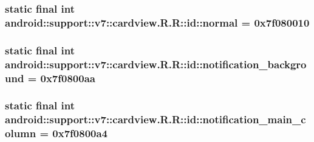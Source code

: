 \hypertarget{classandroid_1_1support_1_1v7_1_1cardview_1_1_r_1_1id_d8b0faa4f60ab44db8f47ee4c0db2f53}{
\subsubsection[{normal}]{\setlength{\rightskip}{0pt plus 5cm}static final int android::support::v7::cardview.R.R::id::normal = 0x7f080010}}
\label{classandroid_1_1support_1_1v7_1_1cardview_1_1_r_1_1id_d8b0faa4f60ab44db8f47ee4c0db2f53}


\hypertarget{classandroid_1_1support_1_1v7_1_1cardview_1_1_r_1_1id_de4f98f43270877527a0c66a2d2cdf48}{
\subsubsection[{notification\_\-background}]{\setlength{\rightskip}{0pt plus 5cm}static final int android::support::v7::cardview.R.R::id::notification\_\-background = 0x7f0800aa}}
\label{classandroid_1_1support_1_1v7_1_1cardview_1_1_r_1_1id_de4f98f43270877527a0c66a2d2cdf48}


\hypertarget{classandroid_1_1support_1_1v7_1_1cardview_1_1_r_1_1id_7bfe2c425e85d4d107383ea2965a1328}{
\subsubsection[{notification\_\-main\_\-column}]{\setlength{\rightskip}{0pt plus 5cm}static final int android::support::v7::cardview.R.R::id::notification\_\-main\_\-column = 0x7f0800a4}}
\label{classandroid_1_1support_1_1v7_1_1cardview_1_1_r_1_1id_7bfe2c425e85d4d107383ea2965a1328}


